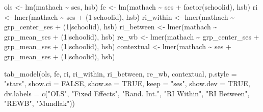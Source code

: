 \documentclass[
  letterpaper,
  DIV=11,
  numbers=noendperiod]{scrreprt}
\newenvironment{Shaded}{\begin{snugshade}}{\end{snugshade}}
\newcommand{\AttributeTok}[1]{\textcolor[rgb]{0.49,0.56,0.16}{#1}}
\newcommand{\ConstantTok}[1]{\textcolor[rgb]{0.53,0.00,0.00}{#1}}
\newcommand{\DecValTok}[1]{\textcolor[rgb]{0.25,0.63,0.44}{#1}}
\newcommand{\FunctionTok}[1]{\textcolor[rgb]{0.02,0.16,0.49}{#1}}
\newcommand{\NormalTok}[1]{\textcolor[rgb]{0.00,0.44,0.13}{#1}}
\newcommand{\OtherTok}[1]{\textcolor[rgb]{0.00,0.44,0.13}{#1}}
\newcommand{\SpecialCharTok}[1]{\textcolor[rgb]{0.25,0.44,0.63}{#1}}
\newcommand{\StringTok}[1]{\textcolor[rgb]{0.25,0.44,0.63}{#1}}
\begin{document}
\begin{Shaded}
\begin{Highlighting}[]
\NormalTok{ols }\OtherTok{\textless{}{-}} \FunctionTok{lm}\NormalTok{(mathach }\SpecialCharTok{\textasciitilde{}}\NormalTok{ ses, hsb)}
\NormalTok{fe }\OtherTok{\textless{}{-}} \FunctionTok{lm}\NormalTok{(mathach }\SpecialCharTok{\textasciitilde{}}\NormalTok{ ses }\SpecialCharTok{+} \FunctionTok{factor}\NormalTok{(schoolid), hsb)}
\NormalTok{ri }\OtherTok{\textless{}{-}} \FunctionTok{lmer}\NormalTok{(mathach }\SpecialCharTok{\textasciitilde{}}\NormalTok{ ses }\SpecialCharTok{+}\NormalTok{ (}\DecValTok{1}\SpecialCharTok{|}\NormalTok{schoolid), hsb)}
\NormalTok{ri\_within }\OtherTok{\textless{}{-}} \FunctionTok{lmer}\NormalTok{(mathach }\SpecialCharTok{\textasciitilde{}}\NormalTok{ grp\_center\_ses }\SpecialCharTok{+}\NormalTok{ (}\DecValTok{1}\SpecialCharTok{|}\NormalTok{schoolid), hsb)}
\NormalTok{ri\_between }\OtherTok{\textless{}{-}} \FunctionTok{lmer}\NormalTok{(mathach }\SpecialCharTok{\textasciitilde{}}\NormalTok{ grp\_mean\_ses }\SpecialCharTok{+}\NormalTok{ (}\DecValTok{1}\SpecialCharTok{|}\NormalTok{schoolid), hsb)}
\NormalTok{re\_wb }\OtherTok{\textless{}{-}} \FunctionTok{lmer}\NormalTok{(mathach }\SpecialCharTok{\textasciitilde{}}\NormalTok{ grp\_center\_ses }\SpecialCharTok{+}\NormalTok{ grp\_mean\_ses }\SpecialCharTok{+}\NormalTok{ (}\DecValTok{1}\SpecialCharTok{|}\NormalTok{schoolid), hsb)}
\NormalTok{contextual }\OtherTok{\textless{}{-}} \FunctionTok{lmer}\NormalTok{(mathach }\SpecialCharTok{\textasciitilde{}}\NormalTok{ ses }\SpecialCharTok{+}\NormalTok{ grp\_mean\_ses }\SpecialCharTok{+}\NormalTok{ (}\DecValTok{1}\SpecialCharTok{|}\NormalTok{schoolid), hsb)}

\FunctionTok{tab\_model}\NormalTok{(ols, fe, ri, ri\_within, ri\_between, re\_wb, contextual,}
          \AttributeTok{p.style =} \StringTok{"stars"}\NormalTok{,}
          \AttributeTok{show.ci =} \ConstantTok{FALSE}\NormalTok{,}
          \AttributeTok{show.se =} \ConstantTok{TRUE}\NormalTok{,}
          \AttributeTok{keep =} \StringTok{"ses"}\NormalTok{,}
          \AttributeTok{show.dev =} \ConstantTok{TRUE}\NormalTok{,}
          \AttributeTok{dv.labels =} \FunctionTok{c}\NormalTok{(}\StringTok{"OLS"}\NormalTok{,}
                        \StringTok{"Fixed Effects"}\NormalTok{,}
                        \StringTok{"Rand. Int."}\NormalTok{,}
                        \StringTok{"RI Within"}\NormalTok{,}
                        \StringTok{"RI Between"}\NormalTok{,}
                        \StringTok{"REWB"}\NormalTok{,}
                        \StringTok{"Mundlak"}\NormalTok{))}
\end{Highlighting}
\end{Shaded}
\end{document}

